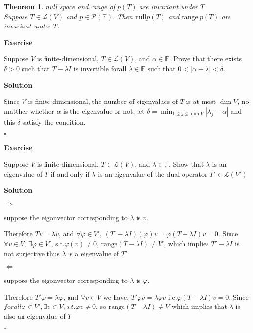 \documentclass{article}
\newtheorem{theorem}{Theorem}[subsection]
\newenvironment{exercise}{%
{\textbf{Exercise\\}
    }
}{
}
\newenvironment{solution}{%
{
    \textbf{Solution\\}
    }
}{
  \hfill $\square$ 
  \par\bigskip 
}
\newcommand{\FF}{\mathbb{F}}
\newcommand{\range}{\text{range}}
\newcommand{\n}{\text{null}}
\begin{document}
\begin{CJK}{UTF8}{gkai}
\begin{theorem}
    null space and range of $p(T)$ are invariant under $T$\\

    Suppose $T \in \mathcal{L}(V)$ and $p \in \mathcal{P}(\FF)$. Then $\n p(T)$ and $\range ~p(T)$ are invariant under $T$.
\end{theorem}

\begin{exercise}
    Suppose $V$ is finite-dimensional, $T \in \mathcal{L}(V)$, and $\alpha \in \FF$. Prove that there exists $\delta > 0$ such that $T - \lambda I$ is invertible forall $\lambda \in \FF$ such that $0 < |\alpha - \lambda| < \delta$.
\end{exercise}

\begin{solution}
    Since $V$ is finite-dimensional, the number of eigenvalues of $T$ is at most $\dim V$, no matther whether $\alpha$ is the eigenvalue or not, let $\delta = \min_{1 \leq j \leq \dim V}{|\lambda_j - \alpha|}$ and this $\delta$ satisfy the condition.
\end{solution}

\begin{exercise}
    Suppose $V$ is finite-dimensional, $T \in \mathcal{L}(V)$, and $\lambda \in \FF$. Show that $\lambda$ is an eigenvalue of $T$ if and only if $\lambda$ is an eigenvalue of the dual operator $T' \in \mathcal{L}(V')$
\end{exercise}

\begin{solution}
    $\Rightarrow$

    suppose the eigonvector corresponding to $\lambda$ is $v$.

    Therefore $T v = \lambda v$, and $\forall \varphi \in V'$, $(T'- \lambda I)(\varphi)v =  \varphi(T - \lambda I)v = 0$. Since $\forall v \in V$, $\exists \varphi \in V'$, s.t.$\varphi (v) \neq 0 $, $\range (T - \lambda I) \neq V'$, which implies $T'- \lambda I$ is not surjective thus $\lambda$ is a eigenvalue of $T'$

    $\Leftarrow$

    suppose the eigonvector corresponding to $\lambda$ is $\varphi$.

    Therefore $T' \varphi = \lambda \varphi$, and $\forall v \in V$ we have, $T' \varphi v = \lambda \varphi v$ i.e.$\varphi(T - \lambda I)v = 0 $. Since $forall \varphi \in V', \exists v \in V, s.t. \varphi v \neq 0$, so $\range(T - \lambda I) \neq V$ which implies that $\lambda$ is also an eigenvalue of $T$
\end{solution}


\end{CJK}
\end{document}

